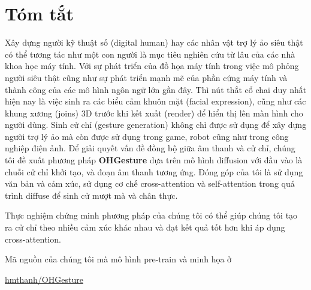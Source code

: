 \chapter*{Tóm tắt}
\label{abstract}

Xây dựng người kỹ thuật số (digital human) hay các nhân vật trợ lý ảo siêu thật có thể tương tác như một con người là mục tiêu nghiên cứu từ lâu của các nhà khoa học máy tính. Với sự phát triển của đồ họa máy tính trong việc mô phỏng người siêu thật cũng như sự phát triển mạnh mẽ của phần cứng máy tính và thành công của các mô hình ngôn ngữ lớn gần đây.
Thì nút thắt cổ chai duy nhất hiện nay là việc sinh ra các biểu cảm khuôn mặt (facial expression), cũng như các khung xương (joins) 3D trước khi kết xuất (render) để hiển thị lên màn hình cho người dùng.
Sinh cử chỉ (gesture generation) không chỉ được sử dụng để xây dựng người trợ lý ảo mà còn được sử dụng trong game, robot cũng như trong công nghiệp điện ảnh.
Để giải quyết vấn đề đồng bộ giữa âm thanh và cử chỉ, chúng tôi đề xuất phương pháp \textbf{OHGesture} dựa trên mô hình diffusion với đầu vào là chuỗi cử chỉ khởi tạo, và đoạn âm thanh tương ứng.	
Đóng góp của tôi là sử dụng văn bản và cảm xúc, sử dụng cơ chế cross-attention và self-attention trong quá trình diffuse để sinh cử mượt mà và chân thực.

Thực nghiệm chứng minh phương pháp của chúng tôi có thể giúp chúng tôi tạo ra cử chỉ theo nhiều cảm xúc khác nhau và đạt kết quả tốt hơn khi áp dụng cross-attention.




Mã nguồn của chúng tôi mà mô hình pre-train và minh họa ở

\href{https://github.com/hmthanh/OHGesture}{hmthanh/OHGesture}